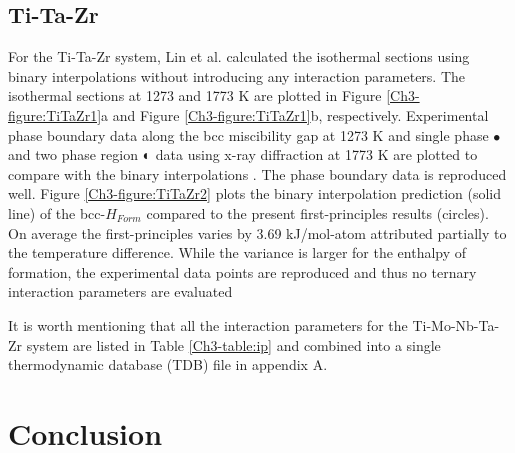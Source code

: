 \subsection{Ti-Ta-Zr}

For the Ti-Ta-Zr system, Lin et al. \cite{Lin1996} calculated the isothermal sections using binary interpolations without introducing any interaction parameters. The isothermal sections at 1273 and 1773 K are plotted in Figure \ref{Ch3-figure:TiTaZr1}a and Figure \ref{Ch3-figure:TiTaZr1}b, respectively. Experimental phase boundary data along the bcc miscibility gap at 1273 K and single phase $\bullet$ and two phase region $\LEFTcircle$ data using x-ray diffraction at 1773 K are plotted to compare with the binary interpolations \cite{Lin1996,Hoch1964}. The phase boundary data is reproduced well. Figure \ref{Ch3-figure:TiTaZr2} plots the binary interpolation prediction (solid line) of the bcc-$H_{Form}$ compared to the present first-principles results (circles). On average the first-principles varies by 3.69 kJ/mol-atom attributed partially to the temperature difference. While the variance is larger for the enthalpy of formation, the experimental data points \cite{Lin1996} are reproduced and thus no ternary interaction parameters are evaluated

It is worth mentioning that all the interaction parameters for the Ti-Mo-Nb-Ta-Zr system are listed in Table \ref{Ch3-table:ip} and combined into a single thermodynamic database (TDB) file in appendix A.

\section{Conclusion}

